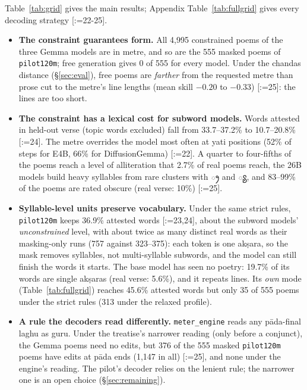 \documentclass[11pt]{article}
\makeatletter
\newcommand{\te}[1]{{\telugufont #1}}
\DeclareRobustCommand{\exref}[1]{{\scriptsize[\def\ex@sep{}\@for\ex@i:=#1\do{\ex@sep
  \expandafter\ex@item\expandafter{\ex@i}\def\ex@sep{, }}]}}
\newcommand{\ex@item}[1]{\in@{-}{#1}\ifin@\ex@range#1\@nil\else\ex@link{#1}\fi}
\def\ex@range#1-#2\@nil{\ex@link{#1}--\ex@link{#2}}
\newcommand{\ex@link}[1]{\hyperref[exp:E#1]{E#1}}
\makeatother
\begin{document}
Table~\ref{tab:grid} gives the main results; Appendix Table~\ref{tab:fullgrid} gives every decoding
strategy \exref{22-25}.
\begin{itemize}
\item \textbf{The constraint guarantees form.} All 4,995 constrained poems of the three Gemma models are in
  metre, and so are the 555 masked poems of \texttt{pilot120m}; free generation gives 0 of 555 for every
  model. Under the chandas distance (\S\ref{sec:eval}), free poems are \emph{farther} from the requested
  metre than prose cut to the metre's line lengths (mean skill $-0.20$ to $-0.33$) \exref{25}: the lines are too short.
\item \textbf{The constraint has a lexical cost for subword models.} Words attested in held-out verse (topic
  words excluded) fall from 33.7--37.2\% to 10.7--20.8\% \exref{24}. The metre overrides the model most often at yati
  positions (52\% of steps for E4B, 66\% for DiffusionGemma) \exref{22}. A quarter to four-fifths of the poems reach a
  level of alliteration that 2.7\% of real poems reach, the 26B models build heavy syllables from rare
  clusters with \te{్ర} and \te{్య}, and 83--99\% of the poems are rated obscure (real verse: 10\%) \exref{25}.
\item \textbf{Syllable-level units preserve vocabulary.} Under the same strict rules, \texttt{pilot120m}
  keeps 36.9\% attested words \exref{23,24}, about the subword models' \emph{unconstrained} level, with about twice as
  many distinct real words as their masking-only runs (757 against 323--375): each token is one akṣara, so
  the mask removes syllables, not multi-syllable subwords, and the model can still finish the words it
  starts. The base model has seen no poetry: 19.7\% of its words are single akṣaras (real verse: 5.6\%),
  and it repeats lines. Its \emph{own} mode (Table~\ref{tab:fullgrid}) reaches 45.6\%
  attested words but only 35 of 555 poems under the strict rules (313 under the relaxed profile).
\item \textbf{A rule the decoders read differently.} \texttt{meter\_engine} reads any pāda-final laghu as guru.
  Under the treatise's narrower reading (only before a conjunct), the Gemma poems need no edits, but 376 of
  the 555 masked \texttt{pilot120m} poems have edits at pāda ends (1,147 in all) \exref{25}, and none under the
  engine's reading. The pilot's decoder relies on the lenient rule; the narrower one is an open choice
  (\S\ref{sec:remaining}).
\end{itemize}
\end{document}
